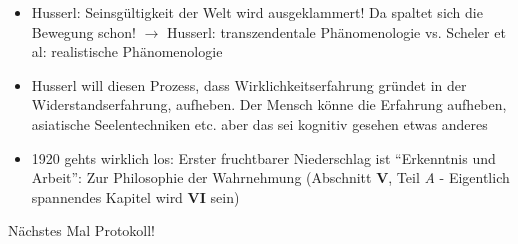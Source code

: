\documentclass[emulatestandardclasses]{scrartcl}
\begin{document}
\begin{itemize}
  \item Husserl: Seinsgültigkeit der Welt wird ausgeklammert! Da spaltet sich die Bewegung schon! $\rightarrow$ Husserl: transzendentale Phänomenologie vs. Scheler et al: realistische Phänomenologie
  \item Husserl will diesen Prozess, dass Wirklichkeitserfahrung gründet in der Widerstandserfahrung, aufheben. Der Mensch könne die Erfahrung aufheben, asiatische Seelentechniken etc. aber das sei kognitiv gesehen etwas anderes
  \item 1920 gehts wirklich los: Erster fruchtbarer Niederschlag ist "`Erkenntnis und Arbeit"': Zur Philosophie der Wahrnehmung (Abschnitt \textbf{V}, Teil \emph{A} - Eigentlich spannendes Kapitel wird \textbf{VI} sein)
\end{itemize}

Nächstes Mal Protokoll!

\newpage
%


\end{document}
